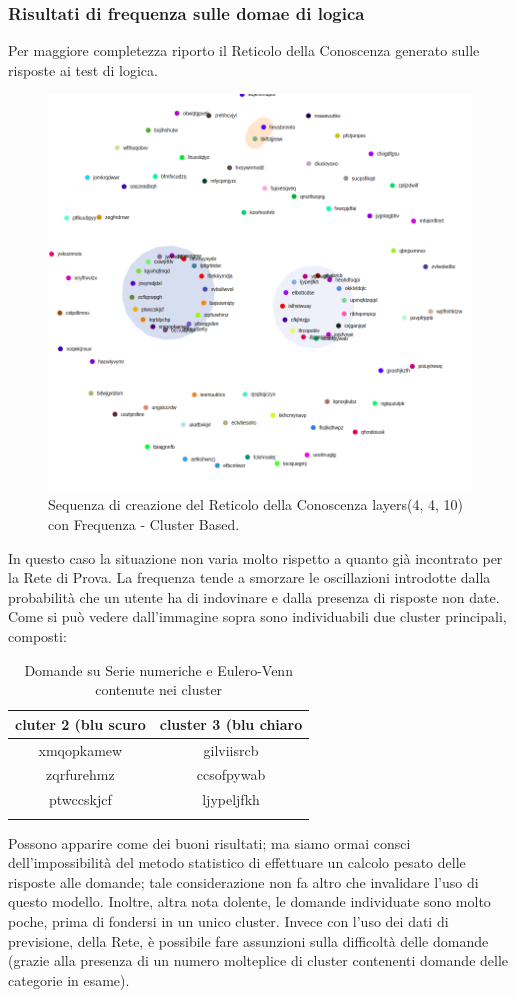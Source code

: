 \subsubsection{Risultati di frequenza sulle domae di logica}
\label{Risultati di frequenza sulle domande di logica}
Per maggiore completezza riporto il Reticolo della Conoscenza generato sulle risposte ai test di logica.
\begin{figure}[H]
\centering
	\includegraphics[width=0.70\linewidth]{./image/frequence-logica(4,4,10).png}
	\caption{Sequenza di creazione del Reticolo della Conoscenza layers(4, 4, 10) con Frequenza - Cluster Based.}
	\label{Sequenza di creazione del Reticolo della Conoscenza layers(4, 4, 10) con Frequenza - Cluster Based.}
\end{figure}
\noindent
In questo caso la situazione non varia molto rispetto a quanto già incontrato per la Rete di Prova. La frequenza tende a smorzare le oscillazioni introdotte dalla probabilità che un utente ha di indovinare e dalla presenza di risposte non date.\\
Come si può vedere dall'immagine sopra sono individuabili due cluster principali, composti:
\begin{longtable}{|c|c|}
	\hline
	\textbf{cluter 2 (blu scuro} & \textbf{cluster 3 (blu chiaro} \\\hline\hline
	xmqopkamew & gilviisrcb \\
	zqrfurehmz & ccsofpywab \\
	ptwccskjcf & ljypeljfkh \\
\hline
\caption{Domande su Serie numeriche e Eulero-Venn contenute nei cluster}\label{tab:domande su serie e eulero-venn contenute nei cluste)}
\end{longtable}
\noindent
Possono apparire come dei buoni risultati; ma siamo ormai consci dell'impossibilità del metodo statistico di effettuare un calcolo pesato delle risposte alle domande; tale considerazione non fa altro che invalidare l'uso di questo modello.
\noindent
Inoltre, altra nota dolente, le domande individuate sono molto poche, prima di fondersi in un unico cluster. Invece con l'uso dei dati di previsione, della Rete, è possibile fare assunzioni sulla difficoltà delle domande (grazie alla presenza di un numero molteplice di cluster contenenti domande delle categorie in esame).


